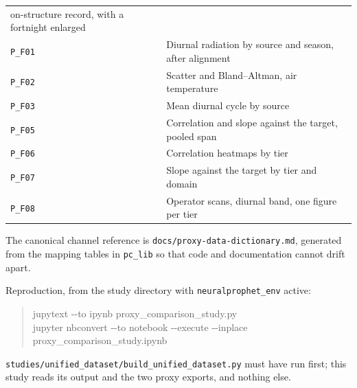 \documentclass[11pt,a4paper]{article}
\begin{document}
\begin{center}
\begin{tabularx}{\textwidth}{L{3.0cm}Y}
on-structure record, with a fortnight enlarged \\
\texttt{P\_F01} & Diurnal radiation by source and season, after alignment \\
\texttt{P\_F02} & Scatter and Bland--Altman, air temperature \\
\texttt{P\_F03} & Mean diurnal cycle by source \\
\texttt{P\_F05} & Correlation and slope against the target, pooled span \\
\texttt{P\_F06} & Correlation heatmaps by tier \\
\texttt{P\_F07} & Slope against the target by tier and domain \\
\texttt{P\_F08} & Operator scans, diurnal band, one figure per tier \\
\bottomrule
\end{tabularx}
\end{center}

The canonical channel reference is \texttt{docs/proxy-data-dictionary.md},
generated from the mapping tables in \texttt{pc\_lib} so that code and
documentation cannot drift apart.

Reproduction, from the study directory with \texttt{neuralprophet\_env} active:

\begin{quote}
\ttfamily\small
jupytext -{}-to ipynb proxy\_comparison\_study.py \\
jupyter nbconvert -{}-to notebook -{}-execute -{}-inplace \\
\phantom{jupyter nbconvert }proxy\_comparison\_study.ipynb
\end{quote}

\texttt{studies/unified\_dataset/build\_unified\_dataset.py} must have run first;
this study reads its output and the two proxy exports, and nothing else.
\end{document}
